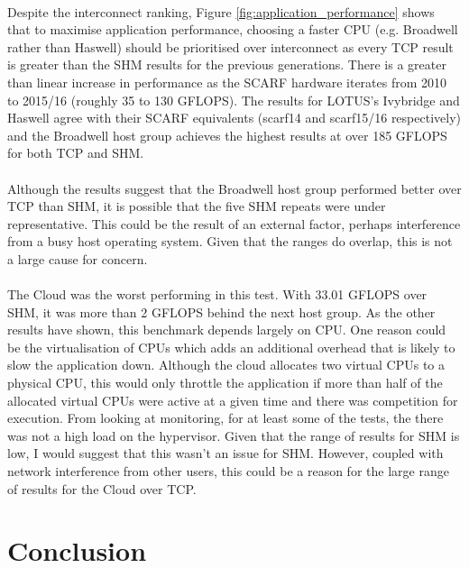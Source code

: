 \documentclass{article}
\begin{document}
        \paragraph{}
        Despite the interconnect ranking, Figure \ref{fig:application_performance} shows that to maximise application performance, choosing a faster CPU (e.g. Broadwell rather than Haswell) should be prioritised over interconnect as every TCP result is greater than the SHM results for the previous generations. There is a greater than linear increase in performance as the SCARF hardware iterates from 2010 to 2015/16 (roughly 35 to 130 GFLOPS). The results for LOTUS's Ivybridge and Haswell agree with their SCARF equivalents (scarf14 and scarf15/16 respectively) and the Broadwell host group achieves the highest results at over 185 GFLOPS for both TCP and SHM.

        \paragraph{}
        Although the results suggest that the Broadwell host group performed better over TCP than SHM, it is possible that the five SHM repeats were under representative. This could be the result of an external factor, perhaps interference from a busy host operating system. Given that the ranges do overlap, this is not a large cause for concern.

        \paragraph{}
        The Cloud was the worst performing in this test. With 33.01 GFLOPS over SHM, it was more than 2 GFLOPS behind the next host group. As the other results have shown, this benchmark depends largely on CPU. One reason could be the virtualisation of CPUs which adds an additional overhead that is likely to slow the application down. Although the cloud allocates two virtual CPUs to a physical CPU, this would only throttle the application if more than half of the allocated virtual CPUs were active at a given time and there was competition for execution. From looking at monitoring, for at least some of the tests, the there was not a high load on the hypervisor. Given that the range of results for SHM is low, I would suggest that this wasn't an issue for SHM. However, coupled with network interference from other users, this could be a reason for the large range of results for the Cloud over TCP.

\section{Conclusion}
\end{document}

